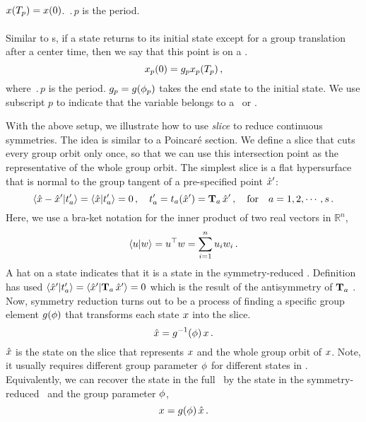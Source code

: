 \paragraph{\Po}  $x({T_{p}}) = x(0)$. $\period{p}$ is the
period.

\paragraph{\Rpo} Similar to \po s,
if a state returns to its initial state except for
a group translation after a center time, then we say that
this point is on a \rpo.
\begin{equation}
  x_p (0) = g_p x_p ({T_{p}} )
  \,,
  \label{eq:rpo}
\end{equation}
where $\period{p}$ is the period. $g_p = g({\bf \phi}_p)$
takes the end state to the initial state. We use subscript $p$ to
indicate that the variable belongs to a \po\ or \rpo.

With the above setup, we illustrate how to use
\emph{slice} to reduce continuous symmetries.
The idea is similar to a Poincar\'e section.
We define a slice that cuts every group orbit only once, so that we
can use this
intersection point as the representative of the whole group orbit.
The simplest slice is a flat hypersurface that is normal to the
group tangent of a pre-specified point ${\hat{x}'}$:
\begin{equation}
  \braket{\sspRed - \slicep}{\sliceTan{a}} = \braket{\sspRed}{\sliceTan{a}} = 0
  \,,\quad
  \sliceTan{a} = \groupTan_a(\slicep) = \Lg_a \, \slicep
  \,,\quad
  \text{for} \quad a = 1, 2, \cdots, s
  \,.
  \label{eq:slice}
\end{equation}
Here, we use a bra-ket notation for the inner product of two
real vectors in $\mathbb{R}^n$,
\[
  \braket{u}{w} = \transp{u} w = \sum_{i=1}^n u_i w_i
  \,.
\]
A hat on a state indicates that it is a state in the symmetry-reduced \statesp.
Definition  has used
$\braket{\slicep}{\sliceTan{a}} = \braket{\slicep}{\Lg_a \, \slicep} = 0$
which is the result of the antisymmetry of $\mathbf{T}_a$ .
Now, symmetry reduction turns out to be a process of finding
a specific group element $g({\bf \phi})$ that transforms each state
$x$ into the slice.
\begin{equation}
  \hat{x} = g^{-1}({\bf \phi}) \, x
  \,.
  \label{eq:slice2}
\end{equation}
$\hat{x}$ is the state on the slice that represents $x$ and the whole group orbit
of $x$. Note, it usually requires different group parameter ${\bf \phi}$ for
different states in .
Equivalently, we can recover the state in the full \statesp\ by
the state in the symmetry-reduced \statesp\ and the group parameter ${\bf \phi}$,
\begin{equation}
  \label{eq:slice3}
  x = g({\bf \phi}) \, \hat{x}
  \,.
\end{equation}

